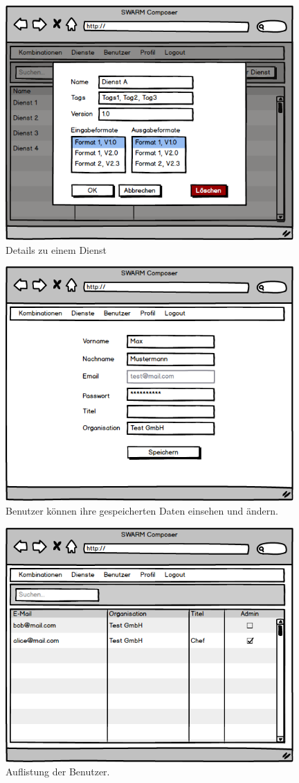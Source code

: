 \begin{figure}[ht]
	\centering
	\includegraphics[keepaspectratio,width=11cm]{img/webfrontend/Dienste_Detail.png}
	\caption{Details zu einem Dienst}
\end{figure}

\begin{figure}[ht]
	\centering
	\includegraphics[keepaspectratio,width=11cm]{img/webfrontend/Profil.png}
	\caption{Benutzer können ihre gespeicherten Daten einsehen und ändern.}
\end{figure}

\begin{figure}[ht]
	\centering
	\includegraphics[keepaspectratio,width=11cm]{img/webfrontend/Benutzer.png}
	\caption{Auflistung der Benutzer.}
\end{figure}
